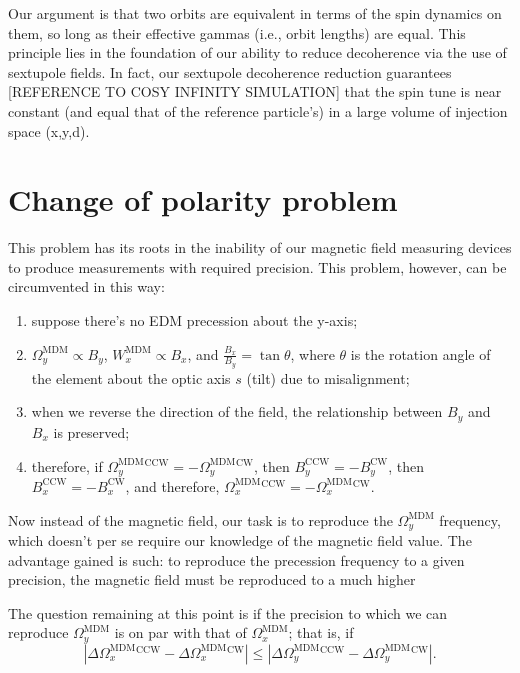 \documentclass{article}
\newcommand{\W}{\Omega}
\newcommand{\MDM}{^\mathrm{MDM}}
\newcommand{\CW}{^\mathrm{CW}}
\newcommand{\CCW}{^\mathrm{CCW}}
\begin{document}
Our argument is that two orbits are equivalent in terms of the spin dynamics on them, so long as their effective gammas (i.e., orbit lengths) are equal. This principle lies in the foundation of our ability to reduce decoherence via the use of sextupole fields. In fact, our sextupole decoherence reduction guarantees [REFERENCE TO COSY INFINITY SIMULATION] that the spin tune is near constant (and equal that of the reference particle's) in a large volume of injection space (x,y,d).

\section{Change of polarity problem}
This problem has its roots in the inability of our magnetic field measuring devices to produce measurements with required precision. This problem, however, can be circumvented in this way:
\begin{enumerate}
\item suppose there's no EDM precession about the y-axis;
\item $\W_y\MDM\propto B_y$, $W_x\MDM\propto B_x$, and $\frac{B_x}{B_y} = \tan\theta$, where $\theta$ is the rotation angle of the element about the optic axis $s$ (tilt) due to misalignment;
\item when we reverse the direction of the field, the relationship between $B_y$ and $B_x$ is preserved;
\item therefore, if $\W_y\MDM\CCW = -\W_y\MDM\CW$, then $B_y\CCW = -B_y\CW$, then $B_x\CCW = -B_x\CW$, and therefore, $\W_x\MDM\CCW = -\W_x\MDM\CW$.
\end{enumerate}

Now instead of the magnetic field, our task is to reproduce the $\W_y\MDM$ frequency, which doesn't per se require our knowledge of the magnetic field value. The advantage gained is such: to reproduce the precession frequency to a given precision, the magnetic field must be reproduced to a much higher 

The question remaining at this point is if the precision to which we can reproduce $\W_y\MDM$ is on par with that of $\W_x\MDM$; that is, if
\begin{equation}\label{eq:calibration_condition}
  |\Delta\W_x\MDM\CCW - \Delta\W_x\MDM\CW| \leq |\Delta\W_y\MDM\CCW - \Delta\W_y\MDM\CW|.
\end{equation}
\end{document}
